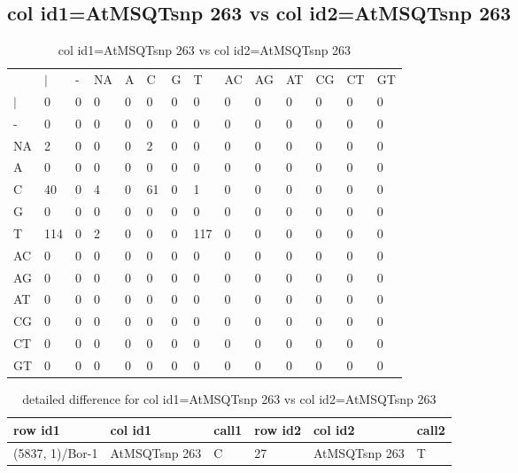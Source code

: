\subsection{col id1=AtMSQTsnp 263 vs col id2=AtMSQTsnp 263}
\begin{center}
\begin{longtable}{|l|l|l|l|l|l|l|l|l|l|l|l|l|l|}
\caption{col id1=AtMSQTsnp 263 vs col id2=AtMSQTsnp 263} \label{table_dm808}\\
\hline
\\
\hline
&$|$&-&NA&A&C&G&T&AC&AG&AT&CG&CT&GT\\
$|$&0&0&0&0&0&0&0&0&0&0&0&0&0\\
-&0&0&0&0&0&0&0&0&0&0&0&0&0\\
NA&2&0&0&0&2&0&0&0&0&0&0&0&0\\
A&0&0&0&0&0&0&0&0&0&0&0&0&0\\
C&40&0&4&0&61&0&1&0&0&0&0&0&0\\
G&0&0&0&0&0&0&0&0&0&0&0&0&0\\
T&114&0&2&0&0&0&117&0&0&0&0&0&0\\
AC&0&0&0&0&0&0&0&0&0&0&0&0&0\\
AG&0&0&0&0&0&0&0&0&0&0&0&0&0\\
AT&0&0&0&0&0&0&0&0&0&0&0&0&0\\
CG&0&0&0&0&0&0&0&0&0&0&0&0&0\\
CT&0&0&0&0&0&0&0&0&0&0&0&0&0\\
GT&0&0&0&0&0&0&0&0&0&0&0&0&0\\
\hline
\end{longtable}
\end{center}

\begin{center}
\begin{longtable}{|l|l|l|l|l|l|}
\caption{detailed difference for col id1=AtMSQTsnp 263 vs col id2=AtMSQTsnp 263} \label{table_dm809}\\
\hline
row id1&col id1&call1&row id2&col id2&call2\\
\hline
(5837, 1)/Bor-1&AtMSQTsnp 263&C&27&AtMSQTsnp 263&T\\
\hline
\end{longtable}
\end{center}

